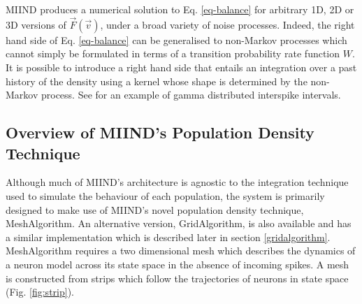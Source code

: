 \documentclass[utf8]{frontiersSCNS} %
\begin{document}
MIIND produces a numerical solution to Eq. \ref{eq-balance} for arbitrary 1D, 2D or 3D versions of $\vec{F}(\vec{v})$, under a broad variety of noise processes. Indeed, the right hand side of Eq. \ref{eq-balance} can be generalised to non-Markov processes which cannot simply be formulated in terms of a transition probability rate function $W$. It is possible to introduce a right hand side that entails an integration over a past history of the density using a kernel whose shape is determined by the non-Markov process. See \cite{lai2017population} for an example of gamma distributed interspike intervals.\\

\subsection{Overview of MIIND’s Population Density Technique}
\label{miindoverview}
Although much of MIIND’s architecture is agnostic to the integration technique used to simulate the behaviour of each population, the system is primarily designed to make use of MIIND’s novel population density technique, MeshAlgorithm. An alternative version, GridAlgorithm, is also available and has a similar implementation which is described later in section \ref{gridalgorithm}. MeshAlgorithm requires a two dimensional mesh which describes the dynamics of a neuron model across its state space in the absence of incoming spikes. A mesh is constructed from strips which follow the trajectories of neurons in state space (Fig. \ref{fig:strip}). 
\end{document}
